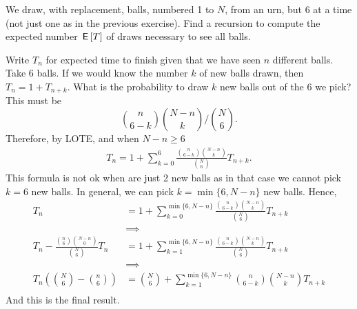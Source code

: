 \begin{exercise}
We draw, with replacement, balls, numbered 1 to $N$, from an urn, but 6 at a time (not just one as in the previous exercise).
Find a recursion to compute the expected number $\,\mathsf{E}\left[T\right]$ of draws necessary to see all balls.
\begin{solution}
  Write $T_{n}$ for expected time to finish given that we have seen $n$ different balls.
  Take 6 balls.
  If we would know the number $k$ of new balls drawn, then $T_{n} = 1 + T_{n+k}$.
  What is the probability to draw $k$ new balls  out of the 6 we pick?
  This must be
\begin{equation}
\label{eq:930}
{n \choose 6-k}{N-n \choose k}\big/{N \choose 6}.
\end{equation}
Therefore, by LOTE, and when $N-n\geq 6$
\begin{align}
T_{n} = 1 + \sum_{k=0}^{6} \frac{{n \choose 6-k}{N-n \choose k}}{{N \choose 6}} T_{n+k}.
\end{align}
This formula is not ok when are just 2 new balls as in that case we cannot pick $k=6$ new balls. In general, we can pick $k=\min\{6, N-n\}$ new balls. Hence,
\begin{align}
T_{n}
&=
1 + \sum_{k=0}^{\min\{6, N-n\}} \frac{{n \choose 6-k}{N-n \choose k}}{{N \choose 6}} T_{n+k} \\
&\implies \\
T_{n} - \frac{{n \choose 6}{N-n \choose 0}}{{N \choose 6}} T_{n}
&=1 + \sum_{k=1}^{\min\{6, N-n\}} \frac{{n \choose 6-k}{N-n \choose k}}{{N \choose 6}} T_{n+k} \\
&\implies \\
T_{n}\left( {N\choose 6}  -{n \choose 6} \right)
&={N\choose 6} + \sum_{k=1}^{\min\{6, N-n\}}{n \choose 6-k}{N-n \choose k} T_{n+k} \\
\end{align}
And this is the final result.

\end{solution}
\end{exercise}

